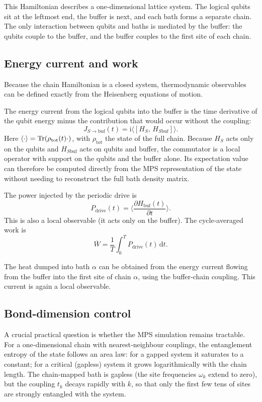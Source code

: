 \documentclass[11pt,a4paper]{article}
\theoremstyle{plain}
\theoremstyle{definition}
\theoremstyle{remark}
\newcommand{\ii}{\mathrm{i}}
\renewcommand{\d}{\mathrm{d}}
\begin{document}
This Hamiltonian describes a one‑dimensional lattice system. The logical qubits sit at the leftmost end, the buffer is next, and each bath forms a separate chain. The only interaction between qubits and baths is mediated by the buffer: the qubits couple to the buffer, and the buffer couples to the first site of each chain.

\subsection{Energy current and work}
Because the chain Hamiltonian is a closed system, thermodynamic observables can be defined exactly from the Heisenberg equations of motion.

The energy current from the logical qubits into the buffer is the time derivative of the qubit energy minus the contribution that would occur without the coupling:
\begin{equation}\label{eq:current_def}
J_{S\to\text{buf}}(t) = \ii\big\langle [H_S,\, H_{S\text{buf}}] \big\rangle.
\end{equation}
Here $\langle\cdot\rangle = \Tr(\rho_{\text{tot}}(t)\cdot)$, with $\rho_{\text{tot}}$ the state of the full chain. Because $H_S$ acts only on the qubits and $H_{S\text{buf}}$ acts on qubits and buffer, the commutator is a local operator with support on the qubits and the buffer alone. Its expectation value can therefore be computed directly from the MPS representation of the state without needing to reconstruct the full bath density matrix.

The power injected by the periodic drive is
\begin{equation}\label{eq:power_def}
P_{\text{drive}}(t) = \Big\langle \frac{\partial H_{\text{buf}}(t)}{\partial t} \Big\rangle.
\end{equation}
This is also a local observable (it acts only on the buffer). The cycle‑averaged work is
\begin{equation}
\overline{W} = \frac1T \int_0^T P_{\text{drive}}(t)\,\d t.
\end{equation}

The heat dumped into bath $\alpha$ can be obtained from the energy current flowing from the buffer into the first site of chain $\alpha$, using the buffer‑chain coupling. This current is again a local observable.

\subsection{Bond‑dimension control}
A crucial practical question is whether the MPS simulation remains tractable. For a one‑dimensional chain with nearest‑neighbour couplings, the entanglement entropy of the state follows an area law: for a gapped system it saturates to a constant; for a critical (gapless) system it grows logarithmically with the chain length. The chain‑mapped bath is gapless (the site frequencies $\omega_k$ extend to zero), but the coupling $t_k$ decays rapidly with $k$, so that only the first few tens of sites are strongly entangled with the system.
\end{document}
